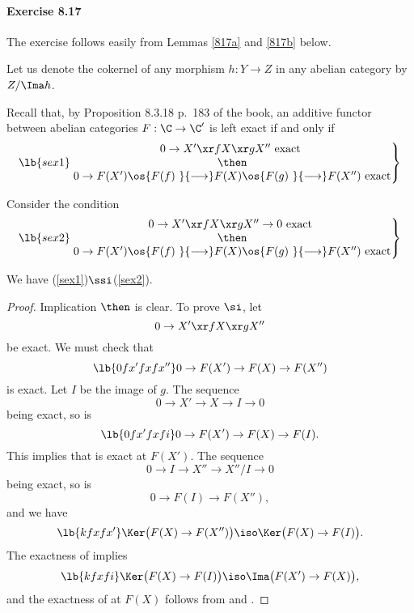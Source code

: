 \documentclass[12pt]{article}
\theoremstyle{remark}
\theoremstyle{definition}
\begin{document}

\paragraph{Exercise 8.17}

The exercise follows easily from Lemmas \ref{817a} and \ref{817b} below.

Let us denote the cokernel of any morphism $h:Y\to Z$ in any abelian category by $Z/\Ima h$. 

Recall that, by Proposition 8.3.18 p.~183 of the book, an additive functor between abelian categories $F:\C\to\C'$ is left exact if and only if
%
\begin{equation}\lb{sex1}
\left.
\begin{matrix}
0\to X'\xr fX\xr gX''\text{ exact }\\ 
\then\\ 
0\to F(X')\os{F(f)\ }{\longrightarrow}F(X)\os{F(g)\ }{\longrightarrow}F(X'')\text{ exact}
\end{matrix}
\right\}
\end{equation}

Consider the condition
%
\begin{equation}\lb{sex2}
\left.
\begin{matrix}
0\to X'\xr fX\xr gX''\to0\text{ exact }\\ 
\then\\ 
0\to F(X')\os{F(f)\ }{\longrightarrow}F(X)\os{F(g)\ }{\longrightarrow}F(X'')\text{ exact}
\end{matrix}
\right\}
\end{equation}

\begin{lem}
We have (\ref{sex1})$\ssi$(\ref{sex2}). 
\end{lem}

\begin{proof}
Implication $\then$ is clear. To prove $\si$, let 
$$
0\to X'\xr fX\xr gX''
$$
be exact. We must check that 
%
\begin{equation}\lb{0fx'fxfx''}
0\to F(X')\to F(X)\to F(X'')
\end{equation} 
% 
is exact. Let $I$ be the image of $g$. The sequence 
$$ 
0\to X'\to X\to I\to0
$$ 
being exact, so is 
%
\begin{equation}\lb{0fx'fxfi}
0\to F(X')\to F(X)\to F(I).
\end{equation} 
% 
This implies that  is exact at $F(X')$. The sequence 
$$ 
0\to I\to X''\to X''/I\to0
$$  
being exact, so is 
$$ 
0\to F(I)\to F(X''),
$$  
and we have 
%
\begin{equation}\lb{kfxfx'}
\Ker\big(F(X)\to F(X'')\big)\iso\Ker\big(F(X)\to F(I)\big).
\end{equation} 
% 
The exactness of  implies 
%
\begin{equation}\lb{kfxfi}
\Ker\big(F(X)\to F(I)\big)\iso\Ima\big(F(X')\to F(X)\big), 
\end{equation} 
% 
and the exactness of  at $F(X)$ follows from  and . 
\end{proof} 
\end{document}
